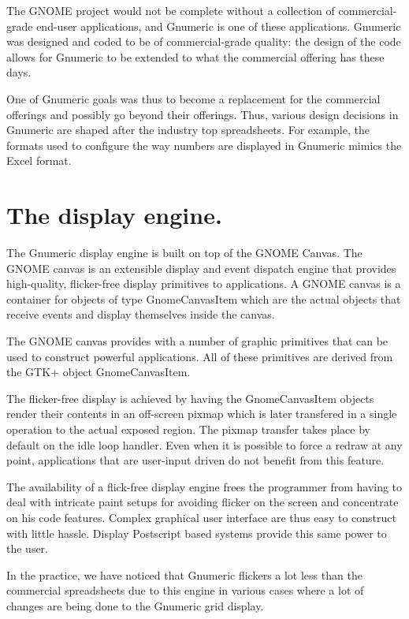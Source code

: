 \documentclass[12pt,twoside,twocolumn]{article}
\begin{document}
The GNOME project would not be complete without a collection of
commercial-grade end-user applications, and Gnumeric is one of these
applications.  Gnumeric was designed and coded to be of
commercial-grade quality: the design of the code allows for Gnumeric
to be extended to what the commercial offering has these days.

One of Gnumeric goals was thus to become a replacement for the
commercial offerings and possibly go beyond their offerings.  Thus,
various design decisions in Gnumeric are shaped after the industry top
spreadsheets.  For example, the formats used to configure the way
numbers are displayed in Gnumeric mimics the Excel format.




\section{The display engine.}

The Gnumeric display engine is built on top of the GNOME
Canvas\cite{canvas}.  The GNOME canvas is an extensible display and event
dispatch engine that provides high-quality, flicker-free display
primitives to applications.  A GNOME canvas is a container for objects
of type GnomeCanvasItem which are the actual objects that receive
events and display themselves inside the canvas.

The GNOME canvas provides with a number of graphic primitives that can
be used to construct powerful applications.  All of these primitives
are derived from the GTK+ object GnomeCanvasItem.

The flicker-free display is achieved by having the GnomeCanvasItem
objects render their contents in an off-screen pixmap which is later
transfered in a single operation to the actual exposed region.  The
pixmap transfer takes place by default on the idle loop handler.  Even
when it is possible to force a redraw at any point, applications that
are user-input driven do not benefit from this feature.

The availability of a flick-free display engine frees the programmer
from having to deal with intricate paint setups for avoiding flicker
on the screen and concentrate on his code features.  Complex graphical
user interface are thus easy to construct with little hassle.  Display
Postscript based systems provide this same power to the user.

In the practice, we have noticed that Gnumeric flickers a lot less
than the commercial spreadsheets due to this engine in various cases
where a lot of changes are being done to the Gnumeric grid display. 
\end{document}
